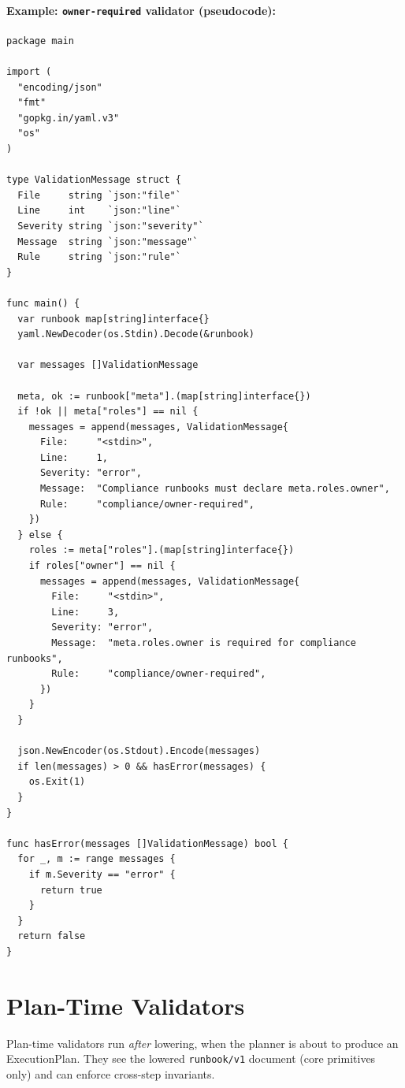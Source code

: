 \paragraph{Example: \texttt{owner-required} validator (pseudocode):}

\begin{verbatim}
package main

import (
  "encoding/json"
  "fmt"
  "gopkg.in/yaml.v3"
  "os"
)

type ValidationMessage struct {
  File     string `json:"file"`
  Line     int    `json:"line"`
  Severity string `json:"severity"`
  Message  string `json:"message"`
  Rule     string `json:"rule"`
}

func main() {
  var runbook map[string]interface{}
  yaml.NewDecoder(os.Stdin).Decode(&runbook)

  var messages []ValidationMessage

  meta, ok := runbook["meta"].(map[string]interface{})
  if !ok || meta["roles"] == nil {
    messages = append(messages, ValidationMessage{
      File:     "<stdin>",
      Line:     1,
      Severity: "error",
      Message:  "Compliance runbooks must declare meta.roles.owner",
      Rule:     "compliance/owner-required",
    })
  } else {
    roles := meta["roles"].(map[string]interface{})
    if roles["owner"] == nil {
      messages = append(messages, ValidationMessage{
        File:     "<stdin>",
        Line:     3,
        Severity: "error",
        Message:  "meta.roles.owner is required for compliance runbooks",
        Rule:     "compliance/owner-required",
      })
    }
  }

  json.NewEncoder(os.Stdout).Encode(messages)
  if len(messages) > 0 && hasError(messages) {
    os.Exit(1)
  }
}

func hasError(messages []ValidationMessage) bool {
  for _, m := range messages {
    if m.Severity == "error" {
      return true
    }
  }
  return false
}
\end{verbatim}

\section{Plan-Time Validators}
\label{sec:plan-validators}

Plan-time validators run \emph{after} lowering, when the planner is about to
produce an ExecutionPlan. They see the lowered \texttt{runbook/v1} document
(core primitives only) and can enforce cross-step invariants.

